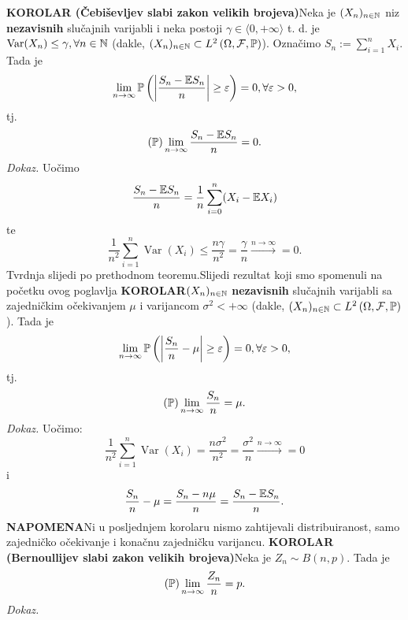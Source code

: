 \documentclass{article}
\newcommand{\Var}{\operatorname{Var}}
\begin{document}
\textbf{KOROLAR (Čebiševljev slabi zakon velikih brojeva)}\newline Neka je \((X_n)_{n\in\Bbb N}\) niz \textbf{nezavisnih} slučajnih varijabli i neka postoji \(\gamma\in\langle 0,+\infty\rangle\) t. d. je\newline \(\Var (X_n)\le\gamma,\forall n\in\Bbb N\) (dakle, \((X_n)_{n\in\Bbb N}\subset L^2\left(\Omega,\mathcal F,\Bbb P\right)\)). Označimo \(S_n:=\sum_{i=1}^nX_i.\) Tada je \[\lim_{n\to\infty}\Bbb P\left(\left|\frac{S_n-\Bbb ES_n}n\right|\ge\varepsilon\right)=0,\forall\varepsilon>0,\] tj. \[(\Bbb P)\lim_{n\to\infty}\frac{S_n-\Bbb ES_n}n=0.\]
\textit{Dokaz.}\newline
Uočimo \[\frac{S_n-\Bbb ES_n}n=\frac1n
\sum_{i=0}^n(X_i-\Bbb EX_i)\] te
\[\frac1{n^2}\sum_{i=1}^n\Var (X_i)\le\frac{n\gamma}{n^2}=\frac\gamma{n}\overset{n\to\infty}{\longrightarrow}=0.\] Tvrdnja slijedi po prethodnom teoremu.\newline\newline Slijedi rezultat koji smo spomenuli na početku ovog poglavlja\newline
\textbf{KOROLAR}\newline \((X_n)_{n\in\Bbb N}\) \textbf{nezavisnih} slučajnih varijabli sa zajedničkim očekivanjem \(\mu\) i varijancom \(\sigma^2<+\infty\) (dakle, \((X_n)_{n\in\Bbb N}\subset L^2\left(\Omega,\mathcal F,\Bbb P\right)\)). Tada je \[\lim_{n\to\infty}\Bbb P\left(\left|\frac{S_n}n-\mu\right|\ge\varepsilon\right)=0,\forall\varepsilon>0,\] tj. \[(\Bbb P)\lim_{n\to\infty}\frac{S_n}n=\mu.\]
\textit{Dokaz.}\newline
Uočimo: \[\frac1{n^2}\sum_{i=1}^n\Var (X_i)=\frac{n\sigma^2}{n^2}=\frac{\sigma^2}n\overset{n\to\infty}{\longrightarrow}=0\] i \[\frac{S_n}n-\mu=\frac{S_n-n\mu}n=\frac{S_n-\Bbb ES_n}n.\] 
\textbf{NAPOMENA}\newline Ni u posljednjem korolaru nismo zahtijevali  distribuiranost, samo zajedničko očekivanje i konačnu zajedničku varijancu.\newline\newline 
\textbf{KOROLAR (Bernoullijev slabi zakon velikih brojeva)}\newline Neka je \(Z_n\sim B(n,p).\) Tada je \[(\Bbb P)\lim_{n\to\infty}\frac{Z_n}n=p.\]
\textit{Dokaz.}\newline
\end{document}
